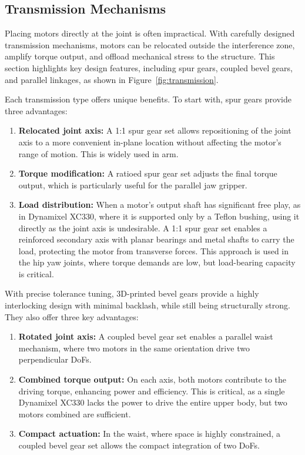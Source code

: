 \subsection{Transmission Mechanisms}
\label{sec:transmission}

Placing motors directly at the joint is often impractical. With carefully designed transmission mechanisms, motors can be relocated outside the interference zone, amplify torque output, and offload mechanical stress to the structure. This section highlights key design features, including spur gears, coupled bevel gears, and parallel linkages, as shown in Figure~\ref{fig:transmission}. 

Each transmission type offers unique benefits. To start with, spur gears provide three advantages:

\begin{enumerate}
    \item \textbf{Relocated joint axis:} A 1:1 spur gear set allows repositioning of the joint axis to a more convenient in-plane location without affecting the motor’s range of motion. This is widely used in \systems arm.
    \item \textbf{Torque modification:} A ratioed spur gear set adjusts the final torque output, which is particularly useful for the parallel jaw gripper.
    \item \textbf{Load distribution:} When a motor’s output shaft has significant free play, as in Dynamixel XC330, where it is supported only by a Teflon bushing, using it directly as the joint axis is undesirable. A 1:1 spur gear set enables a reinforced secondary axis with planar bearings and metal shafts to carry the load, protecting the motor from transverse forces. This approach is used in the hip yaw joints, where torque demands are low, but load-bearing capacity is critical.
\end{enumerate}


With precise tolerance tuning, 3D-printed bevel gears provide a highly interlocking design with minimal backlash, while still being structurally strong. They also offer three key advantages:
\begin{enumerate}
    \item \textbf{Rotated joint axis:} A coupled bevel gear set enables a parallel waist mechanism, where two motors in the same orientation drive two perpendicular DoFs.
    \item \textbf{Combined torque output: } On each axis, both motors contribute to the driving torque, enhancing power and efficiency. This is critical, as a single Dynamixel XC330 lacks the power to drive the entire upper body, but two motors combined are sufficient.
    \item \textbf{Compact actuation:} In the waist, where space is highly constrained, a coupled bevel gear set allows the compact integration of two DoFs. 
\end{enumerate}

